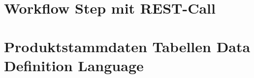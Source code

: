 \section{Workflow Step mit REST-Call}\label{app:db2prov}


\section{Produktstammdaten Tabellen Data Definition Language}\label{app:ddl}

\pagebreak